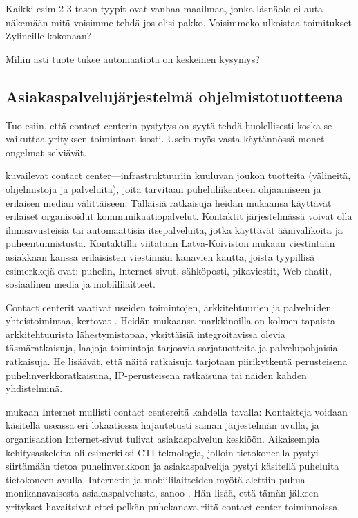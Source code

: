 \documentclass[finnish,12pt,a4paper,pdftex]{article}
\begin{document}
Kaikki esim 2-3-tason tyypit ovat vanhaa maailmaa, jonka läsnäolo ei auta näkemään mitä voisimme tehdä jos olisi pakko. Voisimmeko ulkoistaa toimitukset Zylincille kokonaan?

Mihin asti tuote tukee automaatiota on keskeinen kysymys?

\subsection{Asiakaspalvelujärjestelmä ohjelmistotuotteena}

Tuo esiin, että contact centerin pystytys on syytä tehdä huolellisesti koska se vaikuttaa yrityksen toimintaan isosti. Usein myös vasta käytännössä monet ongelmat selviävät.

\cite{ccgartner} kuvailevat contact center—infrastruktuuriin kuuluvan joukon tuotteita (välineitä, ohjelmistoja ja palveluita), joita tarvitaan puheluliikenteen ohjaamiseen ja erilaisen median välittäiseen. Tälläisiä ratkaisuja heidän mukaansa käyttävät erilaiset organisoidut kommunikaatiopalvelut. Kontaktit järjestelmässä voivat olla ihmisavusteisia tai automaattisia itsepalveluita, jotka käyttävät äänivalikoita ja puheentunnistusta. Kontaktilla viitataan Latva-Koiviston \citeyearpar{latvakoivisto} mukaan viestintään asiakkaan kanssa erilaisisten viestinnän kanavien kautta, joista tyypillisä esimerkkejä ovat: puhelin, Internet-sivut, sähköposti, pikaviestit, Web-chatit, sosiaalinen media ja mobiililaitteet.

Contact centerit vaativat useiden toimintojen, arkkitehtuurien ja palveluiden yhteistoimintaa, kertovat \cite{ccgartner}. Heidän mukaansa markkinoilla on kolmen tapaista arkkitehtuurista lähestymistapaa, yksittäisiä integroitavissa olevia täsmäratkaisuja, laajoja toimintoja tarjoavia sarjatuotteita ja palvelupohjaisia ratkaisuja. He lisäävät, että näitä ratkaisuja tarjotaan piirikytkentä perusteisena puhelinverkkoratkaisuna, IP-perusteisena ratkaisuna tai näiden kahden yhdistelminä. 

\citeauthor{bernier} mukaan Internet mullisti contact centereitä kahdella tavalla: Kontakteja voidaan käsitellä useassa eri lokaatiossa hajautetusti saman järjestelmän avulla, ja organisaation Internet-sivut tulivat asiakaspalvelun keskiöön. Aikaisempia kehitysaskeleita oli esimerkiksi CTI-teknologia, jolloin tietokoneella pystyi siirtämään tietoa puhelinverkkoon ja asiakaspalvelija pystyi käsitellä puheluita tietokoneen avulla. Internetin ja mobiililaitteiden myötä alettiin puhua monikanavaisesta asiakaspalvelusta, sanoo \citeauthor{bernier}. Hän lisää, että tämän jälkeen yritykset havaitsivat ettei pelkän puhekanava riitä contact center-toiminnoissa. 
\end{document}
